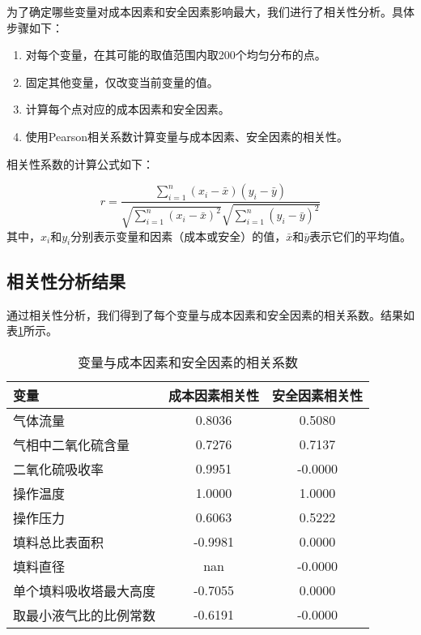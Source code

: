 为了确定哪些变量对成本因素和安全因素影响最大，我们进行了相关性分析。具体步骤如下：

\begin{enumerate}
	\item 对每个变量，在其可能的取值范围内取200个均匀分布的点。
	\item 固定其他变量，仅改变当前变量的值。
	\item 计算每个点对应的成本因素和安全因素。
	\item 使用Pearson相关系数计算变量与成本因素、安全因素的相关性。
\end{enumerate}

相关性系数的计算公式如下：

\begin{equation}
	r = \frac{\sum_{i=1}^{n} (x_i - \bar{x})(y_i - \bar{y})}{\sqrt{\sum_{i=1}^{n} (x_i - \bar{x})^2} \sqrt{\sum_{i=1}^{n} (y_i - \bar{y})^2}}
\end{equation}
其中，$x_i$和$y_i$分别表示变量和因素（成本或安全）的值，$\bar{x}$和$\bar{y}$表示它们的平均值。

\subsection{相关性分析结果}

通过相关性分析，我们得到了每个变量与成本因素和安全因素的相关系数。结果如表\ref{tab:correlation}所示。

\begin{table}[h]
	\centering
	\caption{变量与成本因素和安全因素的相关系数}
	\label{tab:correlation}
	\begin{tabular}{lcc}
		\hline
		变量 & 成本因素相关性 & 安全因素相关性 \\
		\hline
		气体流量 & 0.8036 & 0.5080 \\
		气相中二氧化硫含量 & 0.7276 & 0.7137 \\
		二氧化硫吸收率 & 0.9951 & -0.0000 \\
		操作温度 & 1.0000 & 1.0000 \\
		操作压力 & 0.6063 & 0.5222 \\
		填料总比表面积 & -0.9981 & 0.0000 \\
		填料直径 & nan & -0.0000 \\
		单个填料吸收塔最大高度 & -0.7055 & 0.0000 \\
		取最小液气比的比例常数 & -0.6191 & -0.0000 \\
		\hline
	\end{tabular}
\end{table}

